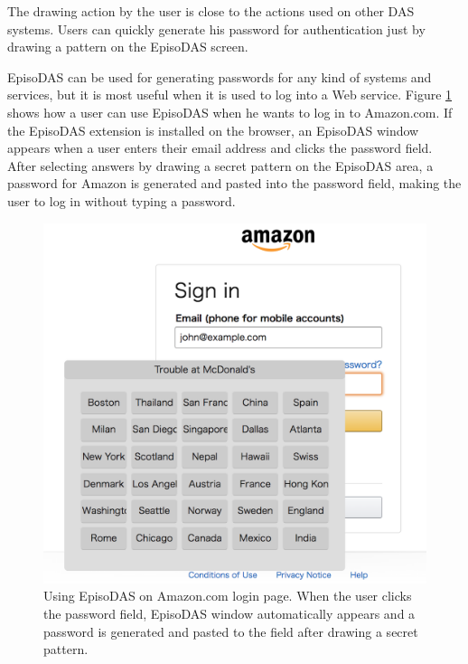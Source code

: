 \documentclass[sigconf]{acmart}
\begin{document}
The drawing action by the user is close to the actions
used on other DAS systems.
Users can quickly generate his password for authentication
just by drawing a pattern on the EpisoDAS screen.

EpisoDAS can be used for generating passwords for any kind of systems and
services, but it is most useful when it is used to log into a Web service.
Figure \ref{Amazon} shows how a user can use EpisoDAS when
he wants to log in to Amazon.com.
If the EpisoDAS extension is installed on the browser,
an EpisoDAS window appears when a user enters their
email address and clicks the password field.
After selecting answers by drawing a secret pattern on the EpisoDAS area,
a password for Amazon is generated and pasted
into the password field, making the user to log in without typing a password.


\begin{figure}[t]
  \includegraphics[width=12cm,bb=0 0 1092 1026]{figures/Amazon.png}
  \caption{Using EpisoDAS on Amazon.com login page.
    When the user clicks the password field, EpisoDAS window automatically appears
    and a password is generated and pasted to the field after drawing a
    secret pattern.}
  \label{Amazon}
\end{figure}
\end{document}
